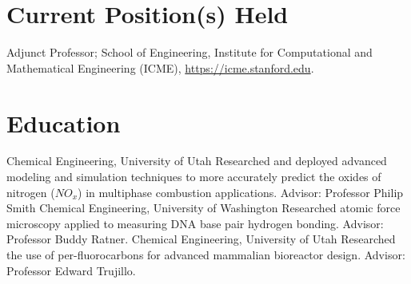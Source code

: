 \documentclass[letterpaper]{twentysecondcv_spd} %
\begin{document}

\section{Current Position(s) Held}

\begin{twentyshort} %
  	 {Adjunct Professor; School of Engineering, Institute for Computational and Mathematical Engineering (ICME), \underline{https://icme.stanford.edu}.}
  \end{twentyshort}
  

\section{Education}

\begin{twenty} %
	 {\normalfont Chemical Engineering, University of Utah} {Researched and deployed advanced
modeling and simulation techniques to more accurately predict the oxides of nitrogen ($NO_x$) in multiphase combustion applications. Advisor: Professor Philip Smith}
	 {\normalfont Chemical Engineering, University of Washington} {Researched atomic force microscopy applied to
          measuring DNA base pair hydrogen bonding. Advisor: Professor Buddy Ratner.}
	 {\normalfont Chemical Engineering, University of Utah} {Researched the use of per-fluorocarbons for advanced mammalian bioreactor design. Advisor: Professor Edward Trujillo.}
\end{twenty}

\end{document}

